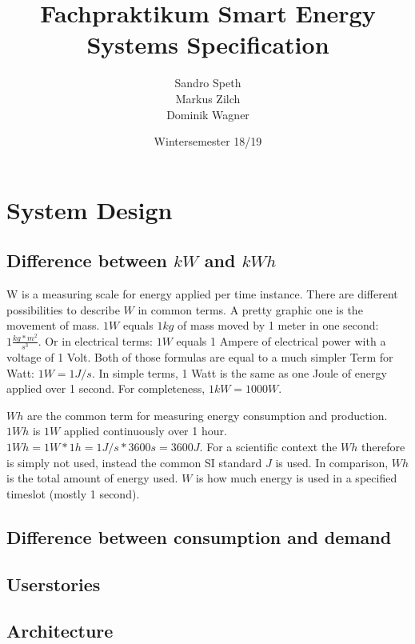 \documentclass[12pt]{scrartcl}
\title{Fachpraktikum Smart Energy Systems
	Specification}
\date{Wintersemester 18/19}
\author{Sandro Speth\\
Markus Zilch\\
Dominik Wagner}
\begin{document}
\maketitle


\section{System Design}\label{sec:systemdesign}

\subsection{Difference between $kW$ and $kWh$}\label{sec:diffEnergy}
W is a measuring scale for energy applied per time instance.
There are different possibilities to describe $W$ in common terms.
A pretty graphic one is the movement of mass.
$1W$ equals $1kg$ of mass moved by 1 meter in one second: $1 \frac{kg*m^2}{s^3}$.
Or in electrical terms: $1W$ equals 1 Ampere of electrical power with a voltage of 1 Volt.
Both of those formulas are equal to a much simpler Term for Watt: $1 W = 1 J/s$.
In simple terms, 1 Watt is the same as one Joule of energy applied over 1 second.
For completeness, $1kW = 1000 W$\cite{Nelson}\cite{Borvon}\cite{SIStandard}.

$Wh$ are the common term for measuring energy consumption and production.
$1Wh$ is $1W$ applied continuously over 1 hour.
$1Wh = 1 W * 1h = 1 J/s * 3600s = 3600J$.
For a scientific context the $Wh$ therefore is simply not used, instead the common SI standard $J$ is used.
In comparison, $Wh$ is the total amount of energy used. $W$ is how much energy is used in a specified timeslot (mostly 1 second)\cite{EURichtlinie}\cite{Bundesgesetz}.


\subsection{Difference between consumption and demand}\label{sec:diffconsumptiondemand}



\subsection{Userstories}\label{sec:userstories}


\subsection{Architecture}






\end{document}
